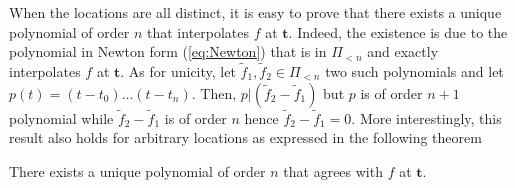 When the locations are all distinct, it is easy to prove that there exists a unique polynomial of order $n$ that 
interpolates $f$ at $\bm{t}$. Indeed, the existence is due to the polynomial in Newton form (\ref{eq:Newton}) that is in 
$\Pi_{<n}$ and exactly interpolates $f$ at $\bm{t}$. As for unicity, let $\tilde{f}_1, \tilde{f}_2 \in \Pi_{<n}$ two 
such polynomials and let $p(t) = (t-t_0)\ldots(t-t_n)$.  Then, $p|(\tilde{f}_2-\tilde{f}_1)$ but $p$ is of order $n+1$ 
polynomial while $\tilde{f}_2-\tilde{f}_1$ is of order $n$ hence $\tilde{f}_2-\tilde{f}_1=0$. More interestingly, this 
result also holds for arbitrary locations as expressed in the following theorem
\begin{thm}\label{thm:unique_pol}
  There exists a unique polynomial of order $n$ that agrees with $f$ at $\bm{t}$.
\end{thm}

